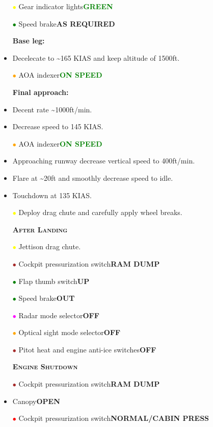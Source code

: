 \documentclass[a4paper,12pt,dvipsnames]{letter}
\newcommand{\button}[1]{\textbf{#1}}
\newcommand{\ok}[1]{\textcolor{Green}{\textbf{#1}}}
\newcommand{\myHead}[1]{{\LARGE\textsc{\textbf{#1}}}}
\newcommand{\ri}{\textcolor{Red}{$\bullet$\;}}
\newcommand{\gi}{\textcolor{Green}{$\bullet$\;}}
\newcommand{\yi}{\textcolor{Yellow}{$\bullet$\;}}
\newcommand{\mi}{\textcolor{Magenta}{$\bullet$\;}}
\newcommand{\oi}{\textcolor{Orange}{$\bullet$\;}}
\renewcommand{\ni}{\textcolor{Brown}{$\bullet$\;}}
\newcommand{\tb}[1]{\textbf{#1}}
\begin{document}
{\begin{itemize}
 \item[\yi] Gear indicator lights\dotfill\ok{GREEN}
 \item[\gi] Speed brake\dotfill\button{AS REQUIRED}
 \item[] \tb{Base leg:}
 \item Decelecate to \textasciitilde165 KIAS and keep altitude of 1500\;ft.
 \item[\oi] AOA indexer\dotfill\ok{ON SPEED}
 \item[] \tb{Final approach:}
 \item Decent rate \textasciitilde1000\;ft/min.
 \item Decrease speed to 145 KIAS.
 \item[\oi] AOA indexer\dotfill\ok{ON SPEED}
 \item Approaching runway decrease vertical speed to 400\;ft/min.
 \item Flare at \textasciitilde20\;ft and smoothly decrease speed to idle.
 \item Touchdown at 135 KIAS.
 \item[\yi] Deploy drag chute and carefully apply wheel breaks.
\end{itemize}
\newpage
\begin{itemize}
 \item[] \myHead{After Landing}
 \item[\yi] Jettison drag chute.
 \item[\ni] Cockpit pressurization switch\dotfill\button{RAM DUMP}
 \item[\gi] Flap thumb switch\dotfill\button{UP}
 \item[\gi] Speed brake\dotfill\button{OUT}
 \item[\mi] Radar mode selector\dotfill\button{OFF}
 \item[\oi] Optical sight mode selector\dotfill\button{OFF}
 \item[\ni] Pitot heat and engine anti-ice switches\dotfill\button{OFF}
\end{itemize}
\begin{itemize}
 \item[] \myHead{Engine Shutdown}
 \item[\ni] Cockpit pressurization switch\dotfill\button{RAM DUMP}
 \item Canopy\dotfill\button{OPEN}
 \item[\ri] Cockpit pressurization switch\dotfill\button{NORMAL/CABIN PRESS}

\end{itemize}}
\end{document}
